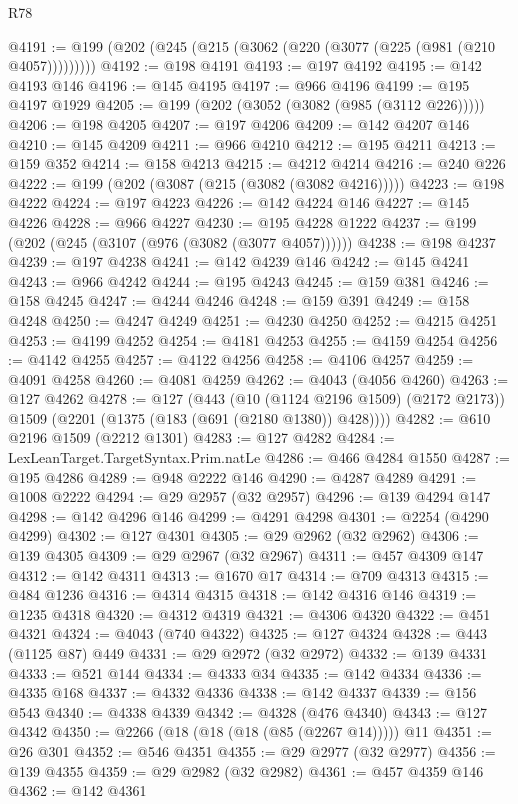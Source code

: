 \begin{lexlean}{R78}
\begin{coremodule}
@4191 := @199 (@202 (@245 (@215 (@3062 (@220 (@3077 (@225 (@981 (@210 @4057)))))))))
@4192 := @198 @4191
@4193 := @197 @4192
@4195 := @142 @4193 @146
@4196 := @145 @4195
@4197 := @966 @4196
@4199 := @195 @4197 @1929
@4205 := @199 (@202 (@3052 (@3082 (@985 (@3112 @226)))))
@4206 := @198 @4205
@4207 := @197 @4206
@4209 := @142 @4207 @146
@4210 := @145 @4209
@4211 := @966 @4210
@4212 := @195 @4211
@4213 := @159 @352
@4214 := @158 @4213
@4215 := @4212 @4214
@4216 := @240 @226
@4222 := @199 (@202 (@3087 (@215 (@3082 (@3082 @4216)))))
@4223 := @198 @4222
@4224 := @197 @4223
@4226 := @142 @4224 @146
@4227 := @145 @4226
@4228 := @966 @4227
@4230 := @195 @4228 @1222
@4237 := @199 (@202 (@245 (@3107 (@976 (@3082 (@3077 @4057))))))
@4238 := @198 @4237
@4239 := @197 @4238
@4241 := @142 @4239 @146
@4242 := @145 @4241
@4243 := @966 @4242
@4244 := @195 @4243
@4245 := @159 @381
@4246 := @158 @4245
@4247 := @4244 @4246
@4248 := @159 @391
@4249 := @158 @4248
@4250 := @4247 @4249
@4251 := @4230 @4250
@4252 := @4215 @4251
@4253 := @4199 @4252
@4254 := @4181 @4253
@4255 := @4159 @4254
@4256 := @4142 @4255
@4257 := @4122 @4256
@4258 := @4106 @4257
@4259 := @4091 @4258
@4260 := @4081 @4259
@4262 := @4043 (@4056 @4260)
@4263 := @127 @4262
@4278 := @127
    (@443
      (@10 (@1124 @2196 @1509) (@2172 @2173))
      @1509
      (@2201 (@1375 (@183 (@691 (@2180 @1380)) @428))))
@4282 := @610 @2196 @1509 (@2212 @1301)
@4283 := @127 @4282
@4284 := LexLeanTarget.TargetSyntax.Prim.natLe
@4286 := @466 @4284 @1550
@4287 := @195 @4286
@4289 := @948 @2222 @146
@4290 := @4287 @4289
@4291 := @1008 @2222
@4294 := @29 @2957 (@32 @2957)
@4296 := @139 @4294 @147
@4298 := @142 @4296 @146
@4299 := @4291 @4298
@4301 := @2254 (@4290 @4299)
@4302 := @127 @4301
@4305 := @29 @2962 (@32 @2962)
@4306 := @139 @4305
@4309 := @29 @2967 (@32 @2967)
@4311 := @457 @4309 @147
@4312 := @142 @4311
@4313 := @1670 @17
@4314 := @709 @4313
@4315 := @484 @1236
@4316 := @4314 @4315
@4318 := @142 @4316 @146
@4319 := @1235 @4318
@4320 := @4312 @4319
@4321 := @4306 @4320
@4322 := @451 @4321
@4324 := @4043 (@740 @4322)
@4325 := @127 @4324
@4328 := @443 (@1125 @87) @449
@4331 := @29 @2972 (@32 @2972)
@4332 := @139 @4331
@4333 := @521 @144
@4334 := @4333 @34
@4335 := @142 @4334
@4336 := @4335 @168
@4337 := @4332 @4336
@4338 := @142 @4337
@4339 := @156 @543
@4340 := @4338 @4339
@4342 := @4328 (@476 @4340)
@4343 := @127 @4342
@4350 := @2266 (@18 (@18 (@18 (@85 (@2267 @14))))) @11
@4351 := @26 @301
@4352 := @546 @4351
@4355 := @29 @2977 (@32 @2977)
@4356 := @139 @4355
@4359 := @29 @2982 (@32 @2982)
@4361 := @457 @4359 @146
@4362 := @142 @4361

\end{coremodule}
\end{lexlean}
